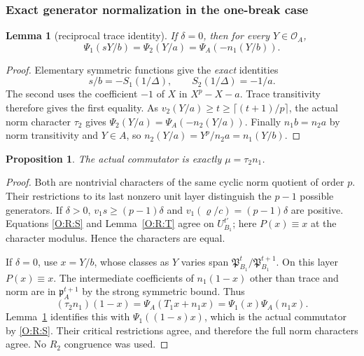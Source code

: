 \documentclass[11pt]{amsart}
\newtheorem{proposition}[theorem]{Proposition}
\newtheorem{lemma}[theorem]{Lemma}
\theoremstyle{definition}
\theoremstyle{remark}
\newcommand{\OO}{\mathcal O}\newcommand{\pp}{\mathfrak p}\newcommand{\PP}{\mathfrak P}
\begin{document}
\subsubsection*{Exact generator normalization in the one-break case}
\begin{lemma}[reciprocal trace identity]\label{O:R:reciprocal}
If $\delta=0$, then for every $Y\in\OO_A$,
\[
 \Psi_1(sY/b)=\Psi_2(Y/a)=\Psi_A(-n_1(Y/b)).
\]
\end{lemma}
\begin{proof}
Elementary symmetric functions give the \emph{exact} identities
\[
 s/b=-S_1(1/\Delta),\qquad S_2(1/\Delta)=-1/a.
\]
The second uses the coefficient $-1$ of $X$ in $X^p-X-a$.
Trace transitivity therefore gives the first equality.
As $v_2(Y/a)\ge t\ge\lceil(t+1)/p\rceil$, the actual norm character
$\tau_2$ gives $\Psi_2(Y/a)=\Psi_A(-n_2(Y/a))$.
Finally $n_1b=n_2a$ by norm transitivity and $Y\in A$, so
$n_2(Y/a)=Y^p/n_2a=n_1(Y/b)$.
\end{proof}

\begin{proposition}\label{O:R:normalize}
The actual commutator is exactly $\mu=\tau_2n_1$.
\end{proposition}
\begin{proof}
Both are nontrivial characters of the same cyclic norm quotient of order
$p$. Their restrictions to its last nonzero unit layer distinguish the
$p-1$ possible generators.
If $\delta>0$, $v_1s\ge(p-1)\delta$ and
$v_1(\varrho/c)=(p-1)\delta$ are positive. Equations \eqref{O:R:S} and
Lemma~\ref{O:R:T} agree on $U_{B_1}^{t'}$; here $P(x)\equiv x$ at the
character modulus. Hence the characters are equal.

If $\delta=0$, use $x=Y/b$, whose classes as $Y$ varies span
$\PP_{B_1}^t/\PP_{B_1}^{t+1}$. On this layer $P(x)\equiv x$.
The intermediate coefficients of $n_1(1-x)$
other than trace and norm are in $\pp_A^{t+1}$ by the strong symmetric
bound. Thus
\[
 (\tau_2n_1)(1-x)=\Psi_A(T_1x+n_1x)
                =\Psi_1(x)\Psi_A(n_1x).
\]
Lemma~\ref{O:R:reciprocal} identifies this with $\Psi_1((1-s)x)$, which is the
actual commutator by \eqref{O:R:S}. Their critical restrictions agree, and
therefore the full norm characters agree. No $R_2$ congruence was used.
\end{proof}
\end{document}
